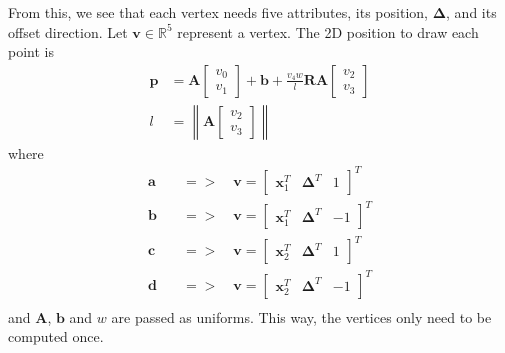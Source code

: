 \documentclass[11pt,a4paper]{article}
\newcommand{\norm}[1]{\left\lVert#1\right\rVert}
\begin{document}
%
From this, we see that each vertex needs five attributes, its
position, $\bm{\Delta}$, and its offset direction.  Let
$\mathbf{v} \in \mathbb{R}^5$ represent a vertex. The 2D position to
draw each point is
%
\begin{align}
  \mathbf{p} &= \mathbf{A} \begin{bmatrix} v_0 \\ v_1 \end{bmatrix} + \mathbf{b} +
  \frac{v_4 w}{l} \mathbf{R} \mathbf{A} \begin{bmatrix} v_2 \\ v_3 \end{bmatrix}\\
  l &= \norm{\mathbf{A} \begin{bmatrix} v_2 \\ v_3 \end{bmatrix}}
\end{align}
%
where
%
\begin{align}
  \mathbf{a} \quad &=> \quad \mathbf{v} =
            \begin{bmatrix} \mathbf{x}_1^T & \bm{\Delta}^T & 1 \end{bmatrix}^T\\
  \mathbf{b} \quad &=> \quad \mathbf{v} =
            \begin{bmatrix} \mathbf{x}_1^T & \bm{\Delta}^T & -1 \end{bmatrix}^T\\
  \mathbf{c} \quad &=> \quad \mathbf{v} =
            \begin{bmatrix} \mathbf{x}_2^T & \bm{\Delta}^T & 1 \end{bmatrix}^T\\
  \mathbf{d} \quad &=> \quad \mathbf{v} =
            \begin{bmatrix} \mathbf{x}_2^T & \bm{\Delta}^T & -1 \end{bmatrix}^T\\
\end{align}
%
and $\mathbf{A}$, $\mathbf{b}$ and $w$ are passed as uniforms. This way, the
vertices only need to be computed once.

\FloatBarrier
\end{document}
